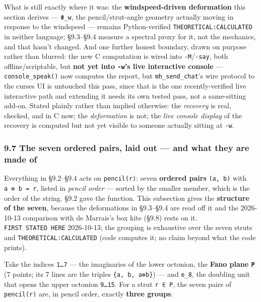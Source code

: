 \documentclass[
  10pt,
]{article}
\begin{document}
What is still exactly where it was: the \textbf{windspeed-driven
deformation} this section derives --- \texttt{Φ\_w}, the
pencil/strut-angle geometry actually moving in response to the windspeed
--- remains Python-verified \texttt{THEORETICAL:CALCULATED} in neither
language; §9.3--§9.4 measure a spectral proxy for it, not the mechanics,
and that hasn't changed. And one further honest boundary, drawn on
purpose rather than blurred: the new C computation is wired into
\texttt{-M}/\texttt{-say}, both offline/scriptable, but \textbf{not yet
into \texttt{-w}'s live interactive console} ---
\texttt{console\_speak()} now computes the report, but
\texttt{mh\_send\_chat}'s wire protocol to the curses UI is untouched
this pass, since that is the one recently-verified live interactive path
and extending it needs its own tested pass, not a same-sitting add-on.
Stated plainly rather than implied otherwise: the \emph{recovery} is
real, checked, and in C now; the \emph{deformation} is not; the
\emph{live console display} of the recovery is computed but not yet
visible to someone actually sitting at \texttt{-w}.

\hypertarget{the-seven-ordered-pairs-laid-out-and-what-they-are-made-of}{%
\subsubsection{9.7 The seven ordered pairs, laid out --- and what they
are made
of}\label{the-seven-ordered-pairs-laid-out-and-what-they-are-made-of}}

Everything in §9.2--§9.4 acts on \texttt{pencil(r)}: seven
\textbf{ordered pairs} \texttt{(a,\ b)} with \texttt{a\ ⊕\ b\ =\ r},
listed in \emph{pencil order} --- sorted by the smaller member, which is
the order of the string. §9.2 gave the function. This subsection gives
the \textbf{structure of the seven}, because the deformations in
§9.3--§9.4 are read off it and the 2026-10-13 comparison with de
Marrais's box kite (§9.8) rests on it. \texttt{FIRST\ STATED\ HERE}
2026-10-13; the grouping is exhaustive over the seven struts and
\texttt{THEORETICAL:CALCULATED} (code computes it; no claim beyond what
the code prints).

Take the indices \texttt{1…7} --- the imaginaries of the lower octonion,
the \textbf{Fano plane \texttt{P}} (7 points; its 7 lines are the
triples \texttt{\{a,\ b,\ a⊕b\}}) --- and \texttt{e\_8}, the doubling
unit that opens the upper octonion \texttt{9…15}. For a strut
\texttt{r\ ∈\ P}, the seven pairs of \texttt{pencil(r)} are, in pencil
order, exactly \textbf{three groups}:
\end{document}
